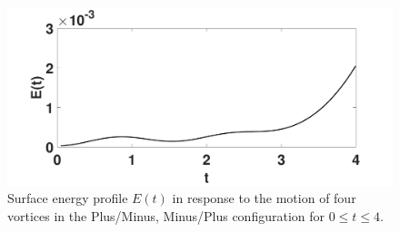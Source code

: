 \documentclass[a4paper,11pt]{article}
\begin{document}
\begin{figure}[!h]
\centering
\includegraphics[width=.75\textwidth]{energy_profile_mu_pt2_F_pt2_pmmp}
\caption{Surface energy profile $E(t)$ in response to the motion of four vortices in the Plus/Minus, Minus/Plus configuration for $0\leq t \leq 4$.}
\label{fig:eprof_pmmp}
\end{figure}

\end{document}
